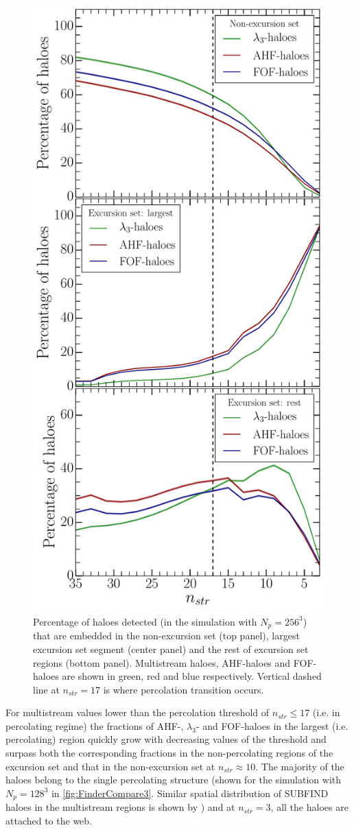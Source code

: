 \documentclass[fleqn,usenatbib,useAMS]{mnras}
\begin{document}
\begin{figure}
\begin{minipage}[t]{.99\linewidth}
  \centering\includegraphics[width=8.cm]{fig14.pdf} 
\end{minipage}\hfill
\caption{ Percentage of haloes detected (in the simulation with $N_p = 256^3$) that are embedded in the non-excursion set (top panel), largest excursion set segment (center panel) and the rest of excursion set regions (bottom panel). Multistream haloes, AHF-haloes and FOF-haloes are shown in green, red and blue respectively. Vertical dashed line at $n_{str} = 17$ is where percolation transition occurs. }
\label{fig:HaloFilAll}
\end{figure}


For multistream values lower than the percolation threshold of $n_{str} \le 17$ (i.e. in percolating regime) the fractions of AHF-, $\lambda_3$-  and FOF-haloes in the largest (i.e. percolating) region quickly grow with decreasing values of the threshold and surpass both the corresponding fractions in the non-percolating  regions of the excursion set and that in the non-excursion set
at $n_{str} \approx 10$. The majority of the haloes belong to the single percolating structure (shown for the simulation with $N_p=128^3$ in \autoref{fig:FinderCompare3}. Similar spatial distribution of SUBFIND haloes \citealt{Springel2001a} in the multistream regions is shown by \citealt{Aragon-Calvo2016}) and at $n_{str} = 3$, all the haloes are attached to the web.  
\end{document}
